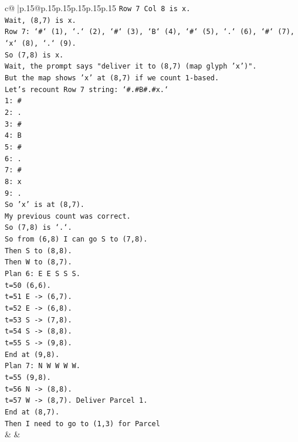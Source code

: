 \documentclass{article}
\begin{document}
{\begin{supertabular}{c@{$\;$}|p{.15\linewidth}@{}p{.15\linewidth}p{.15\linewidth}p{.15\linewidth}p{.15\linewidth}p{.15\linewidth}}
{{{\texttt{Row 7 Col 8 is x.} \\
\texttt{Wait, (8,7) is x.} \\
\texttt{Row 7: `\#` (1), `.` (2), `\#` (3), `B` (4), `\#` (5), `.` (6), `\#` (7), `x` (8), `.` (9).} \\
\texttt{So (7,8) is x.} \\
\texttt{Wait, the prompt says "deliver it to (8,7) (map glyph 'x')".} \\
\texttt{But the map shows 'x' at (8,7) if we count 1{-}based.} \\
\texttt{Let's recount Row 7 string: `\#.\#B\#.\#x.`} \\
\texttt{1: \#} \\
\texttt{2: .} \\
\texttt{3: \#} \\
\texttt{4: B} \\
\texttt{5: \#} \\
\texttt{6: .} \\
\texttt{7: \#} \\
\texttt{8: x} \\
\texttt{9: .} \\
\texttt{So 'x' is at (8,7).} \\
\texttt{My previous count was correct.} \\
\texttt{So (7,8) is `.`.} \\
\texttt{So from (6,8) I can go S to (7,8).} \\
\texttt{Then S to (8,8).} \\
\texttt{Then W to (8,7).} \\
\texttt{Plan 6: E E S S S.} \\
\texttt{t=50 (6,6).} \\
\texttt{t=51 E {-}> (6,7).} \\
\texttt{t=52 E {-}> (6,8).} \\
\texttt{t=53 S {-}> (7,8).} \\
\texttt{t=54 S {-}> (8,8).} \\
\texttt{t=55 S {-}> (9,8).} \\
\texttt{End at (9,8).} \\
\texttt{Plan 7: N W W W W.} \\
\texttt{t=55 (9,8).} \\
\texttt{t=56 N {-}> (8,8).} \\
\texttt{t=57 W {-}> (8,7). Deliver Parcel 1.} \\
\texttt{End at (8,7).} \\
\texttt{Then I need to go to (1,3) for Parcel} \\
            }
        }
    }
    & & \\ \\


\end{supertabular}}
\end{document}
